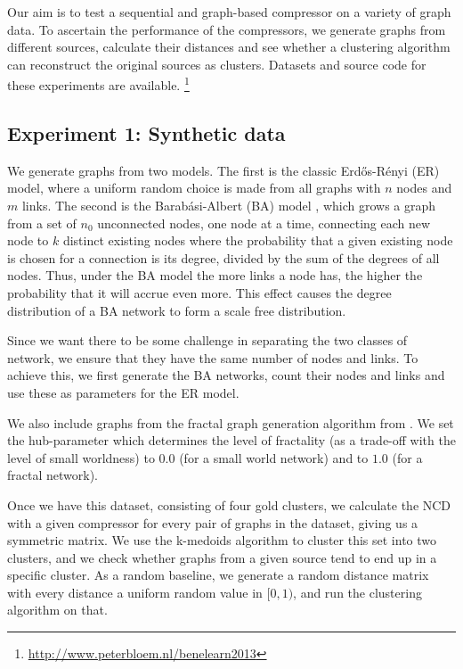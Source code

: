 \documentclass{article}
\begin{document}
Our aim is to test a sequential and graph-based compressor on a variety of graph data. To ascertain the performance of the compressors, we generate graphs from different sources, calculate their distances and see whether a clustering algorithm can reconstruct the original sources as clusters. Datasets and source code for these experiments are available. \footnote{\url{http://www.peterbloem.nl/benelearn2013}}

\subsection*{Experiment 1: Synthetic data}

We generate graphs from two models. The first is the classic Erd\H{o}s-R\'enyi (ER) model, where a uniform random choice is made from all graphs with $n$ nodes and $m$ links. The second is the Barab\'asi-Albert (BA) model \cite{albert2002statistical}, which grows a graph from a set of $n_0$ unconnected nodes, one node at a time, connecting each new node to $k$ distinct existing nodes where the probability that a given existing node is chosen for a connection is its degree, divided by the sum of the degrees of all nodes. Thus, under the BA model the more links a node has, the higher the probability that it will accrue even more. This effect causes the degree distribution of a BA network to form a scale free distribution.

Since we want there to be some challenge in separating the two classes of network, we ensure that they have the same number of nodes and links. To achieve this, we first generate the BA networks, count their nodes and links and use these as parameters for the ER model.
 
We also include graphs from the fractal graph generation algorithm from \cite{song2006origins}. We set the hub-parameter which determines the level of fractality (as a trade-off with the level of small worldness) to $0.0$ (for a small world network) and to $1.0$ (for a fractal network).

Once we have this dataset, consisting of four gold clusters, we calculate the NCD with a given compressor for every pair of graphs in the dataset, giving us a symmetric matrix. We use the k-medoids algorithm to cluster this set into two clusters, and we check whether graphs from a given source tend to end up in a specific cluster. As a random baseline, we generate a random distance matrix with every distance a uniform random value in $[0, 1)$, and run the clustering algorithm on that.
\end{document}
